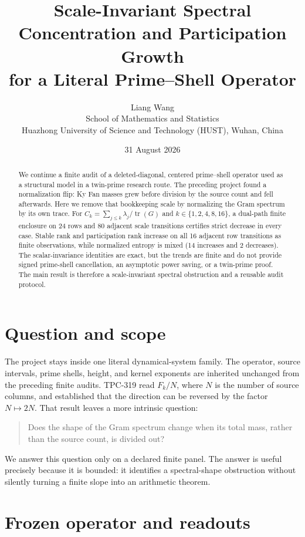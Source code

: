 \documentclass[10pt]{article}
\title{Scale-Invariant Spectral Concentration and Participation Growth\\
for a Literal Prime--Shell Operator}
\author{Liang Wang\\
School of Mathematics and Statistics\\
Huazhong University of Science and Technology (HUST), Wuhan, China}
\date{31 August 2026}
\newcommand{\tr}{\operatorname{tr}}
\begin{document}
\maketitle

\begin{abstract}
We continue a finite audit of a deleted-diagonal, centered prime--shell
operator used as a structural model in a twin-prime research route.  The
preceding project found a normalization flip: Ky Fan masses grew before
division by the source count and fell afterwards.  Here we remove that
bookkeeping scale by normalizing the Gram spectrum by its own trace.  For
$C_k=\sum_{j\leq k}\lambda_j/\tr(G)$ and
$k\in\{1,2,4,8,16\}$, a dual-path finite enclosure on 24 rows and 80
adjacent scale transitions certifies strict decrease in every case.  Stable
rank and participation rank increase on all 16 adjacent row transitions as
finite observations, while normalized entropy is mixed (14 increases and
2 decreases).  The scalar-invariance identities are exact, but the trends
are finite and do not provide signed prime-shell cancellation, an asymptotic
power saving, or a twin-prime proof.  The main result is therefore a
scale-invariant spectral obstruction and a reusable audit protocol.
\end{abstract}

\section{Question and scope}

The project stays inside one literal dynamical-system family.  The operator,
source intervals, prime shells, height, and kernel exponents are inherited
unchanged from the preceding finite audits.  TPC-319 read
$F_k/N$, where $N$ is the number of source columns, and established that the
direction can be reversed by the factor $N\mapsto2N$.  That result leaves a
more intrinsic question:

\begin{quote}
Does the shape of the Gram spectrum change when its total mass, rather than
the source count, is divided out?
\end{quote}

We answer this question only on a declared finite panel.  The answer is
useful precisely because it is bounded: it identifies a spectral-shape
obstruction without silently turning a finite slope into an arithmetic
theorem.

\section{Frozen operator and readouts}
\end{document}
